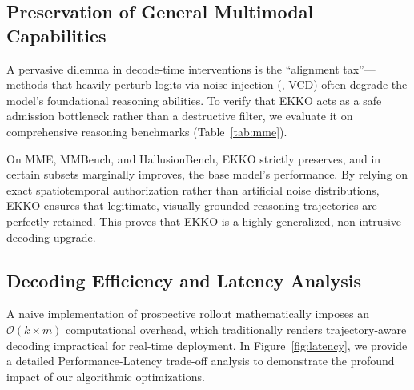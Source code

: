 \subsection{Preservation of General Multimodal Capabilities}

A pervasive dilemma in decode-time interventions is the ``alignment tax''---methods that heavily perturb logits via noise injection (\eg, VCD) often degrade the model's foundational reasoning abilities. To verify that EKKO acts as a safe admission bottleneck rather than a destructive filter, we evaluate it on comprehensive reasoning benchmarks (Table~\ref{tab:mme}).

On MME, MMBench, and HallusionBench, EKKO strictly preserves, and in certain subsets marginally improves, the base model's performance. By relying on exact spatiotemporal authorization rather than artificial noise distributions, EKKO ensures that legitimate, visually grounded reasoning trajectories are perfectly retained. This proves that EKKO is a highly generalized, non-intrusive decoding upgrade.

\begin{table}[t]
\centering
\caption{Results on general multimodal reasoning benchmarks. Higher values ($\uparrow$) denote better performance.}
\label{tab:mme}
\end{table}

\subsection{Decoding Efficiency and Latency Analysis}

A naive implementation of prospective rollout mathematically imposes an $\mathcal{O}(k \times m)$ computational overhead, which traditionally renders trajectory-aware decoding impractical for real-time deployment. In Figure~\ref{fig:latency}, we provide a detailed Performance-Latency trade-off analysis to demonstrate the profound impact of our algorithmic optimizations.

